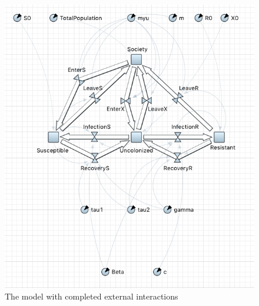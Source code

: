 \begin{figure}[H]
  \centering
  \includegraphics[height=0.7\textwidth]{img/screens/society/society21}
  \caption{The model with completed external interactions}
\end{figure}